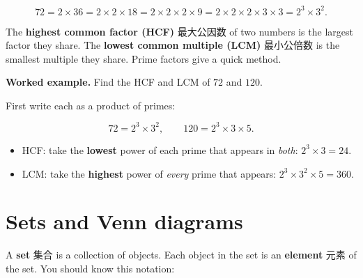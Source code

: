 \documentclass[11pt]{article}
\begin{document}
\[
72 = 2 \times 36 = 2 \times 2 \times 18 = 2 \times 2 \times 2 \times 9 = 2 \times 2 \times 2 \times 3 \times 3 = 2^{3} \times 3^{2}.
\]

The \textbf{highest common factor (HCF)} 最大公因数 of two numbers is the largest factor they share. The \textbf{lowest common multiple (LCM)} 最小公倍数 is the smallest multiple they share. Prime factors give a quick method.

\textbf{Worked example.} Find the HCF and LCM of $72$ and $120$.

First write each as a product of primes:

\[
72 = 2^{3} \times 3^{2}, \qquad 120 = 2^{3} \times 3 \times 5.
\]

\begin{itemize}
\item HCF: take the \textbf{lowest} power of each prime that appears in \emph{both}: $2^{3} \times 3 = 24$.

\item LCM: take the \textbf{highest} power of \emph{every} prime that appears: $2^{3} \times 3^{2} \times 5 = 360$.

\end{itemize}

\section*{Sets and Venn diagrams}

A \textbf{set} 集合 is a collection of objects. Each object in the set is an \textbf{element} 元素 of the set. You should know this notation:

\begin{center}
\end{center}
\end{document}
